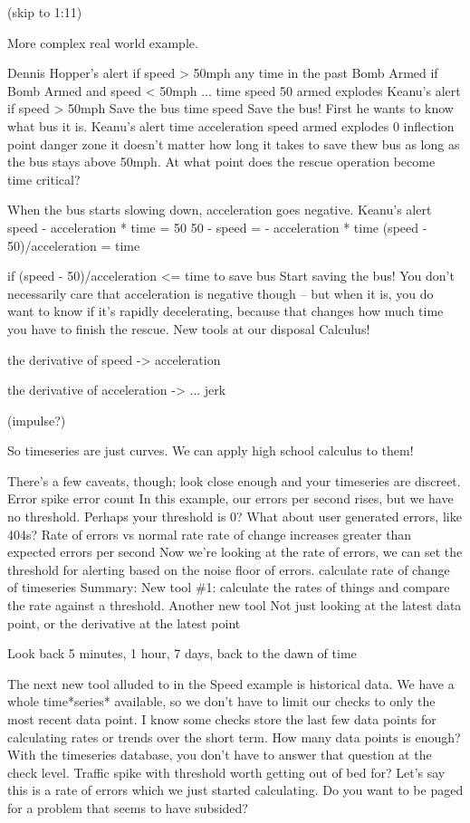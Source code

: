 \documentclass[online,12pt,helvetica]{chaksem}
\begin{document}

(skip to 1:11)

More complex real world example.


Dennis Hopper's alert
if speed > 50mph any time in the past
	Bomb Armed
if Bomb Armed and speed < 50mph ...
time
speed
50
armed
explodes
Keanu's alert
if speed > 50mph
Save the bus
time
speed
Save the bus!
First he wants to know what bus it is.
Keanu's alert
time
acceleration
speed
armed
explodes
0
inflection point
danger zone
it doesn't matter how long it takes to save thew bus as long as the bus stays above 50mph.  At what point does the rescue operation become time critical?

When the bus starts slowing down, acceleration goes negative.
Keanu's alert
speed - acceleration * time = 50
50 - speed = - acceleration * time
(speed - 50)/acceleration = time

if (speed - 50)/acceleration <= time to save bus
	Start saving the bus!
You don't necessarily care that acceleration is negative though -- but when it is, you do want to know if it's rapidly decelerating, because that changes how much time you have to finish the rescue.
New tools at our disposal
Calculus!

the derivative of speed -> acceleration

the derivative of acceleration -> ... jerk

(impulse?)


So timeseries are just curves.  We can apply high school calculus to them!

There's a few caveats, though; look close enough and your timeseries are discreet.
Error spike
error count
In this example, our errors per second rises, but we have no threshold.  Perhaps your threshold is 0?  What about user generated errors, like 404s?
Rate of errors vs normal rate
rate of change increases greater than expected
errors per second
Now we're looking at the rate of errors, we can set the threshold for alerting based on the noise floor of errors.
calculate rate of change of timeseries
Summary: New tool {\#}1: calculate the rates of things and compare the rate against a threshold.
Another new tool
Not just looking at the latest data point, or the derivative at the latest point

Look back 5 minutes, 1 hour, 7 days, back to the dawn of time



The next new tool alluded to in the Speed example is historical data.  We have a whole time*series* available, so we don't have to limit our checks to only the most recent data point.  I know some checks store the last few data points for calculating rates or trends over the short term.  How many data points is enough?  With the timeseries database, you don't have to answer that question at the check level.
Traffic spike with threshold
worth getting out of bed for?
Let's say this is a rate of errors which we just started calculating.  Do you want to be paged for a problem that seems to have subsided?
\end{document}
